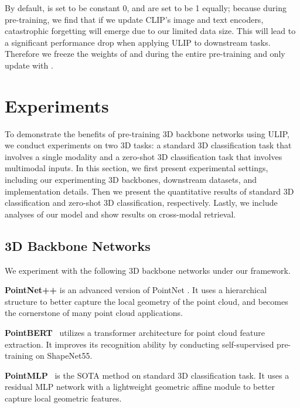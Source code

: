 \documentclass[10pt,twocolumn,letterpaper]{article}
\begin{document}
By default,  is set to be constant 0,  and  are set to be 1 equally; because during pre-training, we find that if we update CLIP's image and text encoders, catastrophic forgetting will emerge due to our limited data size. This will lead to a significant performance drop when applying ULIP to downstream tasks. Therefore we freeze the weights of  and  during the entire pre-training and only update  with .


\section{Experiments}
\label{sec:experiments}
To demonstrate the benefits of pre-training 3D backbone networks using ULIP, we conduct experiments on two 3D tasks: a standard 3D classification task that involves a single modality and a zero-shot 3D classification task that involves multimodal inputs.
In this section, we first present experimental settings, including our experimenting 3D backbones, downstream datasets, and implementation details.
Then we present the quantitative results of standard 3D classification and zero-shot 3D classification, respectively. Lastly, we include analyses of our model and show results on cross-modal retrieval.

\subsection{3D Backbone Networks}
We experiment with the following 3D backbone networks under our framework.

\noindent\textbf{PointNet++} \cite{qi2017pointnet++} is an advanced version of PointNet \cite{qi2017pointnet}. It uses a hierarchical structure to better capture the local geometry of the point cloud, and becomes the cornerstone of many point cloud applications.


\noindent\textbf{PointBERT}~\cite{yu2022point} utilizes a transformer architecture for point cloud feature extraction. It improves its recognition ability by conducting self-supervised pre-training on ShapeNet55.

\noindent\textbf{PointMLP}~\cite{ma2022rethinking} is the SOTA method on standard 3D classification task. It uses a residual MLP network with a lightweight geometric affine module to better capture local geometric features.
\end{document}
